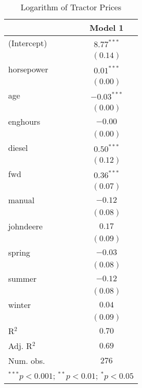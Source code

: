 
\begin{table}
\begin{center}
\begin{tabular}{l c}
\hline
 & Model 1 \\
\hline
(Intercept) & $8.77^{***}$  \\
            & $(0.14)$      \\
horsepower  & $0.01^{***}$  \\
            & $(0.00)$      \\
age         & $-0.03^{***}$ \\
            & $(0.00)$      \\
enghours    & $-0.00$       \\
            & $(0.00)$      \\
diesel      & $0.50^{***}$  \\
            & $(0.12)$      \\
fwd         & $0.36^{***}$  \\
            & $(0.07)$      \\
manual      & $-0.12$       \\
            & $(0.08)$      \\
johndeere   & $0.17$        \\
            & $(0.09)$      \\
spring      & $-0.03$       \\
            & $(0.08)$      \\
summer      & $-0.12$       \\
            & $(0.08)$      \\
winter      & $0.04$        \\
            & $(0.09)$      \\
\hline
R$^2$       & $0.70$        \\
Adj. R$^2$  & $0.69$        \\
Num. obs.   & $276$         \\
\hline
\multicolumn{2}{l}{\scriptsize{$^{***}p<0.001$; $^{**}p<0.01$; $^{*}p<0.05$}}
\end{tabular}
\caption{Logarithm of Tractor Prices}
\label{tab:log_price_reg_1}
\end{center}
\end{table}
